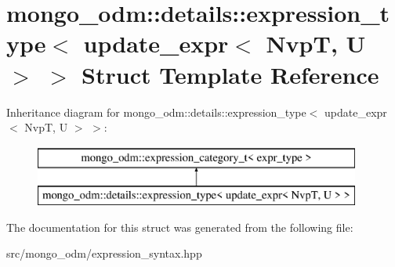 \hypertarget{structmongo__odm_1_1details_1_1expression__type_3_01update__expr_3_01NvpT_00_01U_01_4_01_4}{}\section{mongo\+\_\+odm\+:\+:details\+:\+:expression\+\_\+type$<$ update\+\_\+expr$<$ NvpT, U $>$ $>$ Struct Template Reference}
\label{structmongo__odm_1_1details_1_1expression__type_3_01update__expr_3_01NvpT_00_01U_01_4_01_4}
Inheritance diagram for mongo\+\_\+odm\+:\+:details\+:\+:expression\+\_\+type$<$ update\+\_\+expr$<$ NvpT, U $>$ $>$\+:\begin{figure}[H]
\begin{center}
\leavevmode
\includegraphics[height=2.000000cm]{structmongo__odm_1_1details_1_1expression__type_3_01update__expr_3_01NvpT_00_01U_01_4_01_4}
\end{center}
\end{figure}


The documentation for this struct was generated from the following file\+:\begin{DoxyCompactItemize}
\item 
src/mongo\+\_\+odm/expression\+\_\+syntax.\+hpp\end{DoxyCompactItemize}
